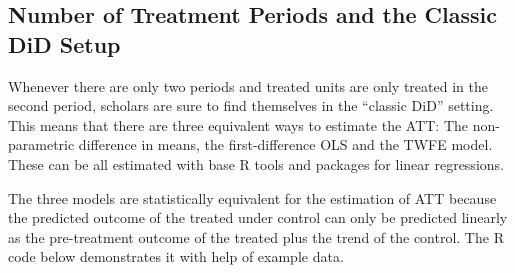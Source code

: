\documentclass[hidelinks]{article}\usepackage[]{graphicx}\usepackage[]{color}
\begin{document}
\subsection{Number of Treatment Periods and the Classic DiD Setup}

Whenever there are only two periods and treated units are only treated in the second period, scholars are sure to find themselves in the ``classic DiD'' setting.
This means that there are three equivalent ways to estimate the ATT: The non-parametric difference in means, the first-difference OLS and the TWFE model. These can be all estimated with base R tools and packages for linear regressions.

The three models are statistically equivalent for the estimation of ATT because the predicted outcome of the treated under control can only be predicted linearly as the pre-treatment outcome of the treated plus the trend of the control. The R code below demonstrates it with help of example data.
\end{document}
